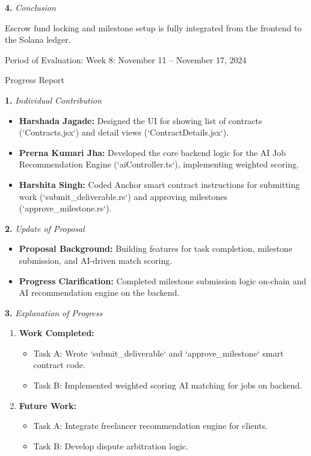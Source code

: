 \documentclass[12pt]{article}
\newcommand{\phasetitle}[1]{{\large Period of Evaluation: #1}\par\vspace{4pt}}
\newcommand{\progressreport}{{\large Progress Report}\par\vspace{4pt}}
\newcommand{\subhead}[2]{\textbf{#1.} \textit{#2}\par}
\begin{document}
\subhead{4}{Conclusion}
Escrow fund locking and milestone setup is fully integrated from the frontend to the Solana ledger.

\newpage

\phasetitle{Week 8: November 11 -- November 17, 2024}

\progressreport

\subhead{1}{Individual Contribution}
\begin{itemize}[leftmargin=2em]
    \item \textbf{Harshada Jagade:} Designed the UI for showing list of contracts (`Contracts.jsx`) and detail views (`ContractDetails.jsx`).
    \item \textbf{Prerna Kumari Jha:} Developed the core backend logic for the AI Job Recommendation Engine (`aiController.ts`), implementing weighted scoring.
    \item \textbf{Harshita Singh:} Coded Anchor smart contract instructions for submitting work (`submit\_deliverable.rs`) and approving milestones (`approve\_milestone.rs`).
\end{itemize}

\subhead{2}{Update of Proposal}
\begin{itemize}[leftmargin=2em]
    \item \textbf{Proposal Background:} Building features for task completion, milestone submission, and AI-driven match scoring.
    \item \textbf{Progress Clarification:} Completed milestone submission logic on-chain and AI recommendation engine on the backend.
\end{itemize}

\newpage

\subhead{3}{Explanation of Progress}
\begin{enumerate}[leftmargin=2em]
    \item \textbf{Work Completed:}
    \begin{itemize}[leftmargin=2em]
        \item Task A: Wrote `submit\_deliverable` and `approve\_milestone` smart contract code.
        \item Task B: Implemented weighted scoring AI matching for jobs on backend.
    \end{itemize}
    \item \textbf{Future Work:}
    \begin{itemize}[leftmargin=2em]
        \item Task A: Integrate freelancer recommendation engine for clients.
        \item Task B: Develop dispute arbitration logic.
    \end{itemize}
\end{enumerate}
\end{document}

